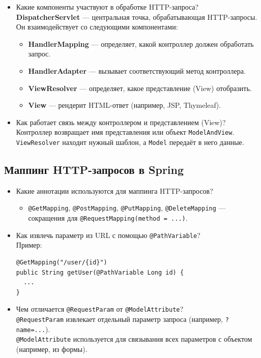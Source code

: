 \documentclass[a4paper,14pt]{article}
\begin{document}
\begin{itemize}
\item Какие компоненты участвуют в обработке HTTP-запроса? \\
\textbf{DispatcherServlet} — центральная точка, обрабатывающая HTTP-запросы. Он взаимодействует со следующими компонентами:
\begin{itemize}
  \item \textbf{HandlerMapping} — определяет, какой контроллер должен обработать запрос.
  \item \textbf{HandlerAdapter} — вызывает соответствующий метод контроллера.
  \item \textbf{ViewResolver} — определяет, какое представление (View) отобразить.
  \item \textbf{View} — рендерит HTML-ответ (например, JSP, Thymeleaf).
\end{itemize}

\item Как работает связь между контроллером и представлением (View)? \\
Контроллер возвращает имя представления или объект \texttt{ModelAndView}. \texttt{ViewResolver} находит нужный шаблон, а \texttt{Model} передаёт в него данные.
\end{itemize}

\subsection{Маппинг HTTP-запросов в Spring}

\begin{itemize}
\item Какие аннотации используются для маппинга HTTP-запросов? \\
\begin{itemize}
  \item \texttt{@GetMapping}, \texttt{@PostMapping}, \texttt{@PutMapping}, \texttt{@DeleteMapping} — сокращения для \texttt{@RequestMapping(method = ...)}.
\end{itemize}

\item Как извлечь параметр из URL с помощью \texttt{@PathVariable}? \\
Пример:
\begin{lstlisting}[style=javastyle]
@GetMapping("/user/{id}")
public String getUser(@PathVariable Long id) {
  ...
}
\end{lstlisting}

\item Чем отличается \texttt{@RequestParam} от \texttt{@ModelAttribute}? \\
\texttt{@RequestParam} извлекает отдельный параметр запроса (например, \texttt{?name=...}). \\
\texttt{@ModelAttribute} используется для связывания всех параметров с объектом (например, из формы).
\end{itemize}
\end{document}
